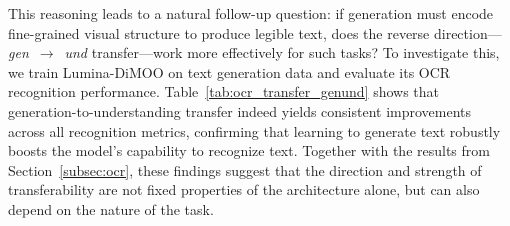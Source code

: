 This reasoning leads to a natural follow-up question: if generation must encode fine-grained visual structure to produce legible text, does the reverse direction—\textit{gen}~$\rightarrow$~\textit{und} transfer—work more effectively for such tasks? To investigate this, we train Lumina-DiMOO on text generation data and evaluate its OCR recognition performance. Table~\ref{tab:ocr_transfer_genund} shows that generation-to-understanding transfer indeed yields consistent improvements across all recognition metrics, confirming that learning to generate text robustly boosts the model's capability to recognize text.  Together with the results from Section~\ref{subsec:ocr}, these findings suggest that the direction and strength of transferability are not fixed properties of the architecture alone, but can also depend on the nature of the task.



